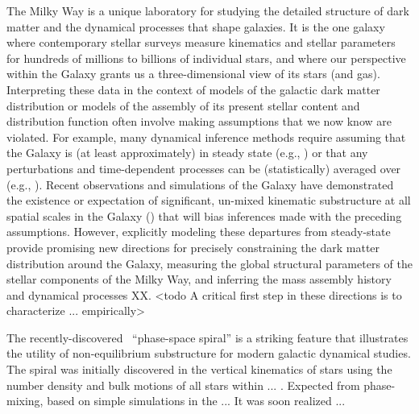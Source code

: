 The Milky Way is a unique laboratory for studying the detailed structure of dark matter and the dynamical processes that shape galaxies.
It is the one galaxy where contemporary stellar surveys measure kinematics and stellar parameters for hundreds of millions to billions of individual stars, and where our perspective within the Galaxy grants us a three-dimensional view of its stars (and gas).
Interpreting these data in the context of models of the galactic dark matter distribution or models of the assembly of its present stellar content and distribution function often involve making assumptions that we now know are violated.
For example, many dynamical inference methods require assuming that the Galaxy is (at least approximately) in steady state (e.g., ) or that any perturbations and time-dependent processes can be (statistically) averaged over (e.g., ).
Recent observations and simulations of the Galaxy have demonstrated the existence or expectation of significant, un-mixed kinematic substructure at all spatial scales in the Galaxy () that will bias inferences made with the preceding assumptions.
However, explicitly modeling these departures from steady-state provide promising new directions for precisely constraining the dark matter distribution around the Galaxy, measuring the global structural parameters of the stellar components of the Milky Way, and inferring the mass assembly history and dynamical processes XX.
<todo A critical first step in these directions is to characterize ... empirically>

The recently-discovered \gaia\ ``phase-space spiral'' is a striking feature that illustrates the utility of non-equilibrium substructure for modern galactic dynamical studies. %
The spiral was initially discovered in the vertical kinematics of stars using the number density and bulk motions of all stars within ...  \citep{Antoja:2018}.
Expected from phase-mixing, based on simple simulations in the ...
It was soon realized ... \citep{Laporte:XX, Binney:XX}

